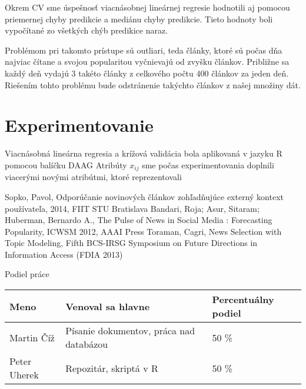 \documentclass[runningheads,a4paper]{llncs}
\begin{document}
Okrem CV sme úspešnosť viacnásobnej lineárnej regresie hodnotili aj pomocou priemernej chyby predikcie a mediánu chyby predikcie. Tieto hodnoty boli vypočítané zo všetkých chýb predikice naraz.      

Problémom pri takomto prístupe sú outliari, teda články, ktoré sú počas dňa najviac čítane a svojou popularitou vyčnievajú od zvyšku článkov. Približne sa každý deň vydajú 3 takéto články z celkového počtu 400 článkov za jeden deň. Riešením tohto problému bude odstránenie takýchto článkov z našej množiny dát.

\section{Experimentovanie}
Viacnásobná lineárna regresia a krížová validácia bola aplikovaná v jazyku R pomocou balíčku DAAG
Atribúty $x_{ij}$ sme počas experimentovania doplnili viacerými novými atribútmi, ktoré reprezentovali   

\begin{thebibliography}{7}
   Sopko, Pavol, Odporúčanie novinových článkov zohľadňujúce externý kontext používateľa, 2014, FIIT STU Bratislava
   Bandari, Roja; Asur, Sitaram; Huberman, Bernardo A., The Pulse of News in Social Media : Forecasting Popularity, ICWSM 2012, AAAI Press
   Toraman, Cagri, News Selection with Topic Modeling, Fifth BCS-IRSG Symposium on Future Directions in Information Access (FDIA 2013)
\end{thebibliography}

\clearpage
{\Large Podiel práce\par}

\vspace{5mm}

\begin{tabular}{|l|l|l|}
  \hline
  \textbf{Meno} & \textbf{Venoval sa hlavne} & \textbf{Percentuálny podiel} \\
  \hline
  Martin Číž & Písanie dokumentov, práca nad databázou & 50 \% \\
  \hline
  Peter Uherek & Repozitár, skriptá v R & 50 \% \\
  \hline
 \end{tabular}
\end{document}

